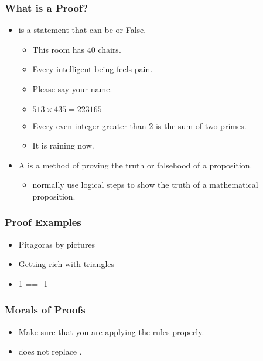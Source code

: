 \begin{frame}
  \frametitle{What is a Proof?}

  \begin{itemize}
  \item {} is a statement that can be
     or \alert{False}.
    \begin{itemize}
    \item This room has 40 chairs.
    \item Every intelligent being feels pain.
    \item Please say your name.
    \item $513 \times 435 = 223165$
    \item Every even integer greater than 2 is the sum of two primes.
    \item It is raining now.
    \end{itemize}

    \bigskip

  \item A  is a method of proving the truth or falsehood of a proposition.
    \begin{itemize}
    \item {} normally use logical steps
      to show the truth of a mathematical proposition.
    \end{itemize}
  \end{itemize}

\end{frame}

\begin{frame}
  \frametitle{Proof Examples}
  \begin{itemize}
  \item Pitagoras by pictures
  \item Getting rich with triangles
  \item 1 == -1
  \end{itemize}
\end{frame}

\begin{frame}
  \frametitle{Morals of Proofs}
  \begin{itemize}
  \item Make sure that you are applying the rules properly.
  \item {} does not replace .
  \end{itemize}
\end{frame}


